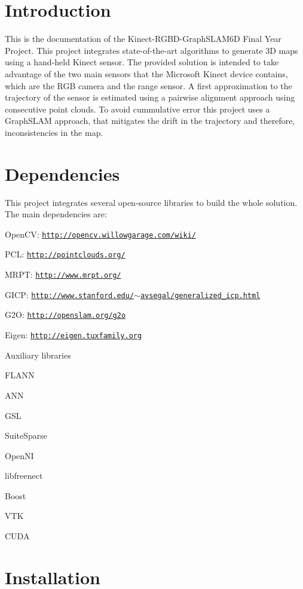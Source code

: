 \hypertarget{index_intro_sec}{}\section{Introduction}\label{index_intro_sec}
This is the documentation of the Kinect-\/RGBD-\/GraphSLAM6D Final Year Project. This project integrates state-\/of-\/the-\/art algorithms to generate 3D maps using a hand-\/held Kinect sensor. The provided solution is intended to take advantage of the two main sensors that the Microsoft Kinect device contains, which are the RGB camera and the range sensor. A first approximation to the trajectory of the sensor is estimated using a pairwise alignment approach using consecutive point clouds. To avoid cummulative error this project uses a GraphSLAM approach, that mitigates the drift in the trajectory and therefore, inconsistencies in the map. \hypertarget{index_dependencies_sec}{}\section{Dependencies}\label{index_dependencies_sec}
This project integrates several open-\/source libraries to build the whole solution. The main dependencies are:
\begin{DoxyItemize}
\item OpenCV: \href{http://opencv.willowgarage.com/wiki/}{\tt http://opencv.willowgarage.com/wiki/}
\item PCL: \href{http://pointclouds.org/}{\tt http://pointclouds.org/}
\item MRPT: \href{http://www.mrpt.org/}{\tt http://www.mrpt.org/}
\item GICP: \href{http://www.stanford.edu/~avsegal/generalized_icp.html}{\tt http://www.stanford.edu/$\sim$avsegal/generalized\_\-icp.html}
\item G2O: \href{http://openslam.org/g2o}{\tt http://openslam.org/g2o}
\item Eigen: \href{http://eigen.tuxfamily.org}{\tt http://eigen.tuxfamily.org}
\item Auxiliary libraries
\begin{DoxyEnumerate}
\item FLANN
\item ANN
\item GSL
\item SuiteSparse
\item OpenNI
\item libfreenect
\item Boost
\item VTK
\item CUDA
\end{DoxyEnumerate}
\end{DoxyItemize}\hypertarget{index_install_sec}{}\section{Installation}\label{index_install_sec}
